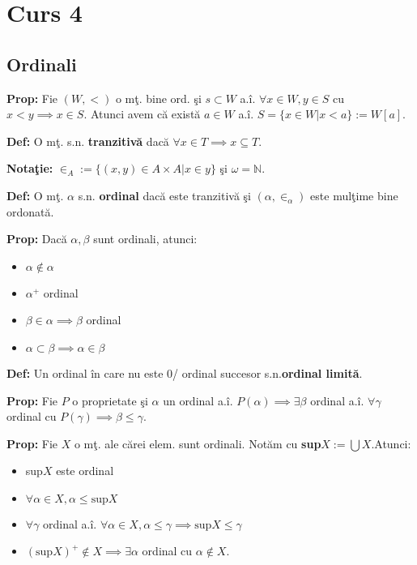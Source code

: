 \documentclass{article}
\begin{document}
\section{Curs 4}

\subsection{Ordinali}

\textbf{Prop:} Fie $(W,<)$ o m\c t. bine ord. \c si $s\subset W$ a.\^ i. $\forall x\in W, y\in S$ cu $x<y \implies x\in S$. Atunci avem c\u a exist\u a $a\in W$ a.\^ i. $S=\{x\in W| x<a\}:=W[a]$.

\textbf{Def:} O m\c t. s.n. \textbf{tranzitiv\u a} dac\u a $\forall x\in T \implies x\subseteq T$.

\textbf{Nota\c tie:} $\in_A:=\{(x,y)\in A\times A| x\in y\}$ \c si $\omega=\mathbb N$.

\textbf{Def:} O m\c t. $\alpha$ s.n. \textbf{ordinal} dac\u a este tranzitiv\u a \c si $(\alpha, \in_{\alpha})$ este mul\c time bine ordonat\u a.

\textbf{Prop:} Dac\u a $\alpha,\beta$ sunt ordinali, atunci:
\begin{itemize}
    \item $\alpha \notin \alpha$
    \item $\alpha^+$ ordinal
    \item $\beta\in \alpha \implies \beta$ ordinal
    \item $\alpha \subset\beta \implies \alpha\in\beta$
\end{itemize}

\textbf{Def:} Un ordinal \^ in care nu este 0/ ordinal succesor s.n.\textbf{ordinal limit\u a}.

\textbf{Prop:} Fie $P$ o proprietate \c si $\alpha$ un ordinal a.\^ i. $P(\alpha)\implies \exists \beta$ ordinal a.\^ i. $\forall \gamma$ ordinal cu $P(\gamma) \implies \beta \leq \gamma$.

\textbf{Prop:} Fie $X$ o m\c t. ale c\u arei elem. sunt ordinali. Not\u am cu \textbf{sup$X:=\bigcup X$}.Atunci:
\begin{itemize}
    \item sup$X$ este ordinal
    \item $\forall \alpha\in X,\alpha\leq \text{sup}X$
    \item $\forall \gamma$ ordinal a.\^ i. $\forall \alpha\in X,\alpha\leq\gamma \implies \text{sup}X\leq \gamma$
    \item $(\text{sup}X)^+\notin X \implies\exists \alpha$ ordinal cu $\alpha\notin X$.
\end{itemize}
\end{document}
